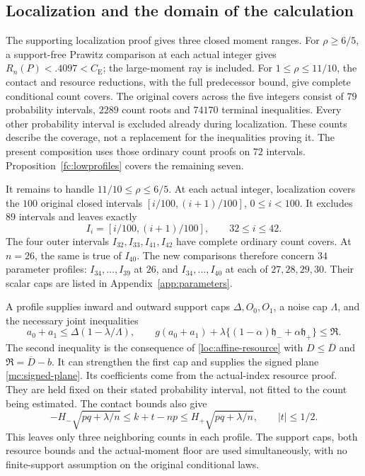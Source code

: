 \documentclass[aop,preprint]{imsart}
\theoremstyle{definition}
\newcommand{\CE}{C_{\mathrm E}}
\numberwithin{equation}{section}
\begin{document}
\subsection{Localization and the domain of the calculation}
The supporting localization proof gives three closed moment ranges.
For $\rho\ge6/5$, a support-free Prawitz comparison at each actual
integer gives $R_n(P)<.4097<\CE$; the large-moment ray is included.
For $1\le\rho\le11/10$, the contact and resource reductions,
with the full predecessor bound, give complete conditional count
covers. The original covers across the five integers consist of $79$ probability
intervals, $2289$ count roots and $74170$ terminal inequalities.
Every other probability interval is excluded already during
localization. These counts describe the coverage, not a replacement
for the inequalities proving it. The present composition uses those
ordinary count proofs on $72$ intervals.
Proposition~\ref{fc:lowprofiles} covers the remaining seven.

It remains to handle $11/10\le\rho\le6/5$.
At each actual integer, localization covers the $100$ original
closed intervals $[i/100,(i+1)/100]$, $0\le i<100$.
It excludes $89$ intervals and leaves exactly
\[
 I_i=[i/100,(i+1)/100],\qquad 32\le i\le42.
\]
The four outer intervals $I_{32},I_{33},I_{41},I_{42}$ have
complete ordinary count covers. At $n=26$, the same is true of
$I_{40}$. The new comparisons therefore concern $34$ parameter
profiles: $I_{34},\ldots,I_{39}$ at $26$, and
$I_{34},\ldots,I_{40}$ at each of $27,28,29,30$.
Their scalar caps are listed in Appendix~\ref{app:parameters}.

A profile supplies inward and outward support caps
$\Delta,O_0,O_1$, a noise cap $\Lambda$, and the necessary joint
inequalities
\begin{equation}\label{fc:resources}
 a_0+a_1\le\Delta(1-\lambda/\Lambda),\qquad
g(a_0+a_1)+\lambda
       \{(1-\alpha)\mathfrak h_-+\alpha\mathfrak h_+\}
       \le\mathfrak R.
\end{equation}
The second inequality is the consequence of
\eqref{loc:affine-resource} with $D\le\overline D$ and
$\mathfrak R=\overline D-b$. It can strengthen the first cap and supplies
the signed plane \eqref{mc:signed-plane}. Its coefficients come
from the actual-index resource proof. They are held fixed on
their stated probability interval, not fitted to the count being
estimated. The contact bounds also give
\begin{equation}\label{fc:contact}
 -H_-\sqrt{pq+\lambda/n}
 \le k+t-np\le H_+\sqrt{pq+\lambda/n},\qquad |t|\le1/2.
\end{equation}
This leaves only three neighboring counts in each profile.
The support caps, both resource bounds and the actual-moment floor
are used simultaneously, with no finite-support assumption on the
original conditional laws.
\end{document}
